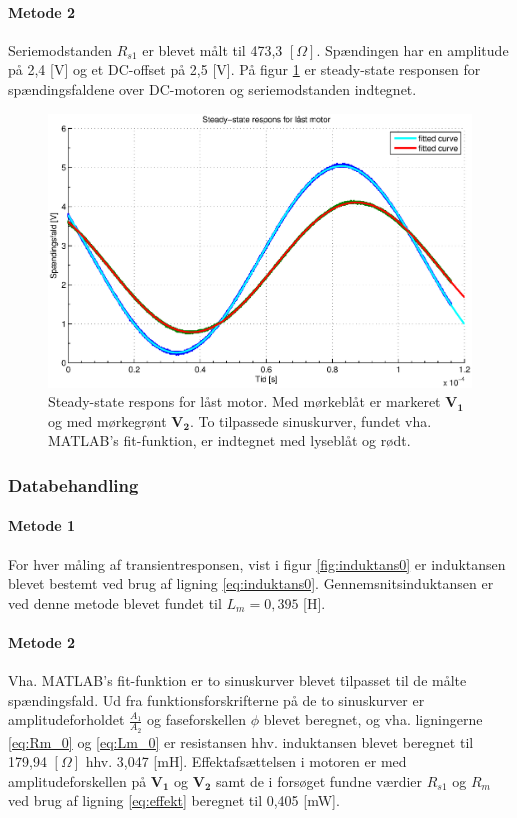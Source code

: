 \paragraph{Metode 2}
Seriemodstanden \(R_{s1}\) er blevet målt til 473,3 \([\Omega]\).
Spændingen har en amplitude på 2,4 [V] og et DC-offset på 2,5 [V].
På figur \ref{fig:induktans1} er steady-state responsen for spændingsfaldene over DC-motoren og seriemodstanden indtegnet.
\begin{figure}[th!]
	\centering
	\includegraphics[width=1\textwidth]{./graphics/induktans1.eps}
	\caption[Steady-state respons for låst motor]
		{Steady-state respons for låst motor. Med mørkeblåt er markeret \(\mathbf{V_1}\) og med mørkegrønt \(\mathbf{V_2}\).
		To tilpassede sinuskurver, fundet vha. MATLAB's fit-funktion, er indtegnet med lyseblåt og rødt.}
	\label{fig:induktans1}
\end{figure}

\subsubsection{Databehandling}
\paragraph{Metode 1}
For hver måling af transientresponsen, vist i figur \ref{fig:induktans0} er induktansen blevet
bestemt ved brug af ligning \ref{eq:induktans0}.
Gennemsnitsinduktansen er ved denne metode blevet fundet til \(L_m=0,395\) [H].

\paragraph{Metode 2}
Vha. MATLAB's fit-funktion er to sinuskurver blevet tilpasset til de målte spændingsfald.
Ud fra funktionsforskrifterne på de to sinuskurver er amplitudeforholdet \(\frac{A_1}{A_2}\)
og faseforskellen \(\phi\) blevet beregnet,
og vha. ligningerne \ref{eq:Rm_0} og \ref{eq:Lm_0} er resistansen hhv. induktansen blevet beregnet til
179,94 \([\Omega]\) hhv. 3,047 [mH].
Effektafsættelsen i motoren er med amplitudeforskellen på \(\mathbf{V_1}\) og \(\mathbf{V_2}\) samt
de i forsøget fundne værdier \(R_{s1}\) og \(R_m\) ved brug af ligning \ref{eq:effekt} beregnet til 0,405 [mW].

